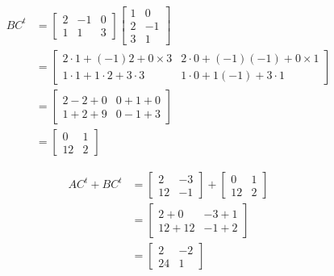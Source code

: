 \documentclass[a4paper,12pt,fleqn]{article}
\begin{document}
\begin{answer}
  \begin{align*}
    BC^t
    & =
      \begin{bmatrix}
        2 & -1 & 0 \\
        1 &  1 & 3
      \end{bmatrix}
      \begin{bmatrix}
        1 &  0 \\
        2 & -1 \\
        3 &  1
      \end{bmatrix}
    \\[2mm]
    & =
      \begin{bmatrix}
        2 \cdot 1 + (-1)  2  + 0 \times 3 &
        2 \cdot 0 + (-1)(-1) + 0 \times 1
        \\
        1 \cdot 1 + 1 \cdot 2 +  3 \cdot 3 &
        1 \cdot 0 + 1 (-1)    +  3 \cdot 1
      \end{bmatrix}
    \\[2mm]
    & =
      \begin{bmatrix}
        2 - 2 + 0 & 0 + 1 + 0 \\
        1 + 2 + 9 & 0 - 1 + 3
      \end{bmatrix}
    \\[2mm]
    & =
      \begin{bmatrix}
         0 & 1 \\
        12 & 2
      \end{bmatrix}
  \end{align*}

  \begin{align*}
    AC^t + BC^t
    & =
      \begin{bmatrix}
         2 & -3 \\
        12 & -1
      \end{bmatrix}
      +
      \begin{bmatrix}
         0 & 1 \\
        12 & 2
      \end{bmatrix}
    \\[2mm]
    & =
      \begin{bmatrix}
         2 +  0 & -3 + 1 \\
        12 + 12 & -1 + 2
      \end{bmatrix}
    \\[2mm]
    & =
      \begin{bmatrix}
         2 & -2 \\
        24 &  1
      \end{bmatrix}
  \end{align*}
\end{answer}
\end{document}
